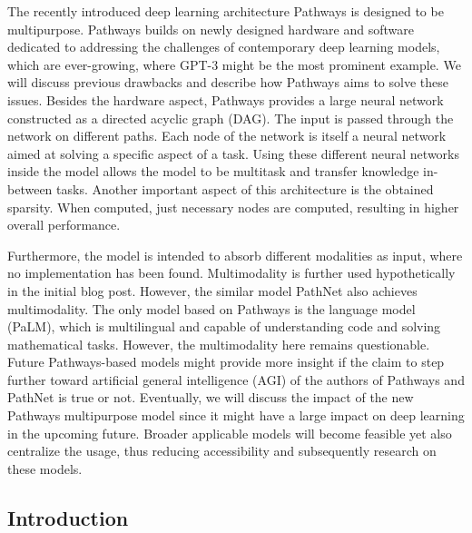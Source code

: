 \documentclass[
]{krantz}
\begin{document}
The recently introduced deep learning architecture Pathways is designed to be multipurpose. Pathways builds on newly designed hardware and software dedicated to addressing the challenges of contemporary deep learning models, which are ever-growing, where GPT-3 might be the most prominent example. We will discuss previous drawbacks and describe how Pathways aims to solve these issues. Besides the hardware aspect, Pathways provides a large neural network constructed as a directed acyclic graph (DAG). The input is passed through the network on different paths. Each node of the network is itself a neural network aimed at solving a specific aspect of a task. Using these different neural networks inside the model allows the model to be multitask and transfer knowledge in-between tasks. Another important aspect of this architecture is the obtained sparsity. When computed, just necessary nodes are computed, resulting in higher overall performance.

Furthermore, the model is intended to absorb different modalities as input, where no implementation has been found. Multimodality is further used hypothetically in the initial blog post. However, the similar model PathNet also achieves multimodality. The only model based on Pathways is the language model (PaLM), which is multilingual and capable of understanding code and solving mathematical tasks. However, the multimodality here remains questionable. Future Pathways-based models might provide more insight if the claim to step further toward artificial general intelligence (AGI) of the authors of Pathways and PathNet is true or not. Eventually, we will discuss the impact of the new Pathways multipurpose model since it might have a large impact on deep learning in the upcoming future. Broader applicable models will become feasible yet also centralize the usage, thus reducing accessibility and subsequently research on these models.

\hypertarget{introduction-1}{%
\subsection{Introduction}\label{introduction-1}}
\end{document}
